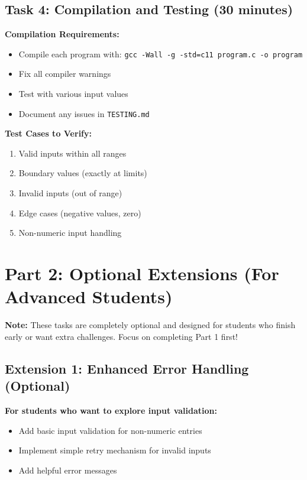 \documentclass[11pt,a4paper]{article}
\begin{document}
\subsection{Task 4: Compilation and Testing (30 minutes)}

\textbf{Compilation Requirements:}
\begin{itemize}
    \item Compile each program with: \texttt{gcc -Wall -g -std=c11 program.c -o program}
    \item Fix all compiler warnings
    \item Test with various input values
    \item Document any issues in \texttt{TESTING.md}
\end{itemize}

\textbf{Test Cases to Verify:}
\begin{enumerate}
    \item Valid inputs within all ranges
    \item Boundary values (exactly at limits)
    \item Invalid inputs (out of range)
    \item Edge cases (negative values, zero)
    \item Non-numeric input handling
\end{enumerate}

\section{Part 2: Optional Extensions (For Advanced Students)}

\textbf{Note:} These tasks are completely optional and designed for students who finish early or want extra challenges. Focus on completing Part 1 first!

\subsection{Extension 1: Enhanced Error Handling (Optional)}

\textbf{For students who want to explore input validation:}
\begin{itemize}
    \item Add basic input validation for non-numeric entries
    \item Implement simple retry mechanism for invalid inputs
    \item Add helpful error messages
\end{itemize}
\end{document}
